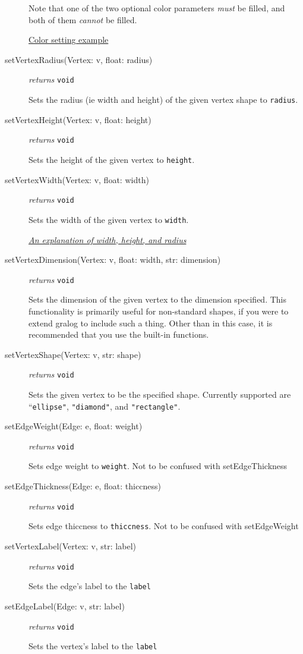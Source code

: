 \documentclass{article}
\newcounter{example}
\begin{document}
\begin{description}
Note that one of the two optional color parameters \textit{must} be filled, and both of them \textit{cannot} be filled.

\hyperref[colorNamesSupportedByGralog]{Color setting example}

\item[setVertexRadius(Vertex: v, float: radius)] \emph{returns}
  \texttt{void}

Sets the radius (ie width and height) of the given vertex shape to \texttt{radius}.

\item[setVertexHeight(Vertex: v, float: height)] \emph{returns}
  \texttt{void}

Sets the height of the given vertex to \texttt{height}.

\item[setVertexWidth(Vertex: v, float: width)] \emph{returns}
  \texttt{void}

Sets the width of the given vertex to \texttt{width}. 

\hyperref[radiusWidthHeightDiagram]{\textit{An explanation of width, height, and radius}}

  
\item[setVertexDimension(Vertex: v, float: width, str: dimension)]
  \emph{returns} \texttt{void}

Sets the dimension of the given vertex to the dimension specified. This functionality is primarily useful for non-standard shapes, if you were to extend gralog to include such a thing. Other than in this case, it is recommended that you use the built-in functions.

\item[setVertexShape(Vertex: v, str: shape)] \emph{returns} \texttt{void}

Sets the given vertex to be the specified shape. Currently supported
are ``\texttt{ellipse"}, \texttt{"diamond"}, and \texttt{"rectangle"}.

\item[setEdgeWeight(Edge: e, float: weight)] \emph{returns} \texttt{void}

Sets edge weight to \texttt{weight}. Not to be confused with setEdgeThickness

\item[setEdgeThickness(Edge: e, float: thiccness)] \emph{returns} \texttt{void}

Sets edge thiccness to \texttt{thiccness}. Not to be confused with setEdgeWeight

\item[setVertexLabel(Vertex: v, str: label)] \emph{returns} \texttt{void}

Sets the edge's label to the \texttt{label}

\item[setEdgeLabel(Edge: v, str: label)] \emph{returns} \texttt{void}

Sets the vertex's label to the \texttt{label}
  
\end{description}
\end{document}
